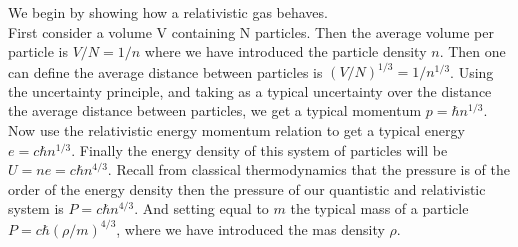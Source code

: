 \documentclass[a4paper,12pt]{article}
\begin{document}
We begin by showing how a relativistic gas behaves.\\

First consider a volume V containing N particles. Then the average
volume per particle is $V/N = 1/n$ where we have introduced the
particle density $n$. Then one can define the average distance between particles
is $(V/N)^{1/3} = 1/n^{1/3}$. Using the uncertainty principle, and taking as a
typical uncertainty over the distance the average distance between
particles, we get a typical momentum $p= \hbar n^{1/3}$. Now use the
relativistic energy momentum relation to get a
typical energy $e= c \hbar n^{1/3}$. Finally the energy density of this system of
particles will be $U= n e = c \hbar n^{4/3}$. Recall from classical
thermodynamics that the pressure is of the order of the energy density
then the pressure of our quantistic and relativistic
system is $P= c \hbar n^{4/3}$. And setting equal to $m$ the typical
mass of a particle $P=c \hbar (\rho/m)^{4/3} $, where we have
introduced the mas density $\rho$.
\end{document}
